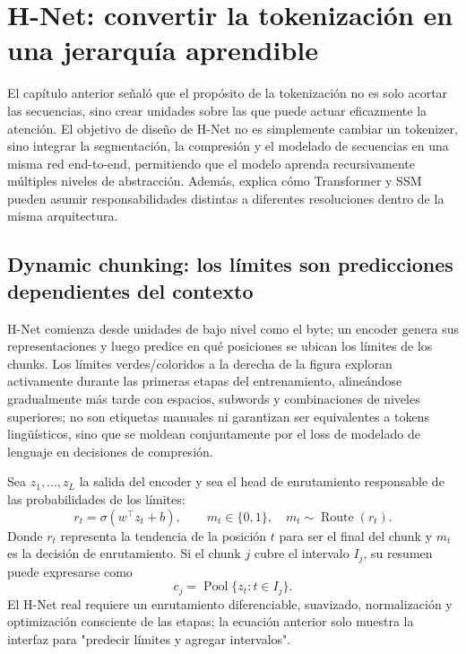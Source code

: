 \section{H-Net: convertir la tokenización en una jerarquía aprendible}

El capítulo anterior señaló que el propósito de la tokenización no es solo acortar las secuencias, sino crear unidades sobre las que puede actuar eficazmente la atención. El objetivo de diseño de H-Net no es simplemente cambiar un tokenizer, sino integrar la segmentación, la compresión y el modelado de secuencias en una misma red end-to-end, permitiendo que el modelo aprenda recursivamente múltiples niveles de abstracción. Además, explica cómo Transformer y SSM pueden asumir responsabilidades distintas a diferentes resoluciones dentro de la misma arquitectura.

\subsection{Dynamic chunking: los límites son predicciones dependientes del contexto}

H-Net comienza desde unidades de bajo nivel como el byte; un encoder genera sus representaciones y luego predice en qué posiciones se ubican los límites de los chunks. Los límites verdes/coloridos a la derecha de la figura exploran activamente durante las primeras etapas del entrenamiento, alineándose gradualmente más tarde con espacios, subwords y combinaciones de niveles superiores; no son etiquetas manuales ni garantizan ser equivalentes a tokens lingüísticos, sino que se moldean conjuntamente por el loss de modelado de lenguaje en decisiones de compresión.


Sea $z_1,\ldots,z_L$ la salida del encoder y sea el head de enrutamiento responsable de las probabilidades de los límites:
\[
r_t=\sigma(w^\top z_t+b),
\qquad
m_t\in\{0,1\},\quad m_t\sim\operatorname{Route}(r_t).
\]
Donde $r_t$ representa la tendencia de la posición $t$ para ser el final del chunk y $m_t$ es la decisión de enrutamiento. Si el chunk $j$ cubre el intervalo $I_j$, su resumen puede expresarse como
\[
c_j=\operatorname{Pool}\{z_t:t\in I_j\}.
\]
El H-Net real requiere un enrutamiento diferenciable, suavizado, normalización y optimización consciente de las etapas; la ecuación anterior solo muestra la interfaz para "predecir límites y agregar intervalos".

